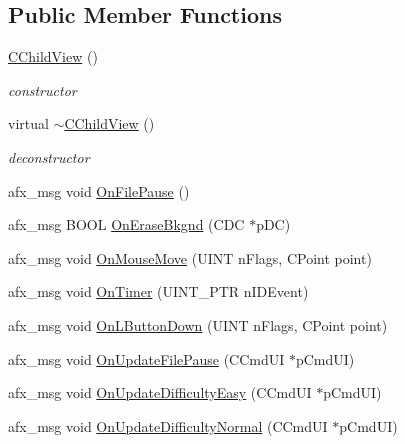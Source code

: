 \subsection*{Public Member Functions}
\begin{DoxyCompactItemize}
\item 
\mbox{\label{class_c_child_view_aff5af7c162c10755edbe58f260ded6d4}} 
\mbox{\hyperlink{class_c_child_view_aff5af7c162c10755edbe58f260ded6d4}{C\+Child\+View}} ()
\begin{DoxyCompactList}\small\item\em constructor \end{DoxyCompactList}\item 
\mbox{\label{class_c_child_view_a5b033b5e0a130950719a173b86418698}} 
virtual \mbox{\hyperlink{class_c_child_view_a5b033b5e0a130950719a173b86418698}{$\sim$\+C\+Child\+View}} ()
\begin{DoxyCompactList}\small\item\em deconstructor \end{DoxyCompactList}\item 
afx\+\_\+msg void \mbox{\hyperlink{class_c_child_view_aa6859229c37062c75e80ffc41aaeb2dd}{On\+File\+Pause}} ()
\item 
afx\+\_\+msg B\+O\+OL \mbox{\hyperlink{class_c_child_view_a6060e6d09d522d345dcee5a01d41c1f0}{On\+Erase\+Bkgnd}} (C\+DC $\ast$p\+DC)
\item 
afx\+\_\+msg void \mbox{\hyperlink{class_c_child_view_ad3cb2f8d9fa9a6fb06989513dee5a8bc}{On\+Mouse\+Move}} (U\+I\+NT n\+Flags, C\+Point point)
\item 
afx\+\_\+msg void \mbox{\hyperlink{class_c_child_view_a4c6bb8bd631cee84bb80c948f3d6d98a}{On\+Timer}} (U\+I\+N\+T\+\_\+\+P\+TR n\+I\+D\+Event)
\item 
afx\+\_\+msg void \mbox{\hyperlink{class_c_child_view_af513a57c45ce8b9dcc09dd934e228534}{On\+L\+Button\+Down}} (U\+I\+NT n\+Flags, C\+Point point)
\item 
afx\+\_\+msg void \mbox{\hyperlink{class_c_child_view_a8aa93825b42eb316b550b11d7643c058}{On\+Update\+File\+Pause}} (C\+Cmd\+UI $\ast$p\+Cmd\+UI)
\item 
afx\+\_\+msg void \mbox{\hyperlink{class_c_child_view_a881809e1f085e134ddb31a76cb7b72d4}{On\+Update\+Difficulty\+Easy}} (C\+Cmd\+UI $\ast$p\+Cmd\+UI)
\item 
afx\+\_\+msg void \mbox{\hyperlink{class_c_child_view_ac93835b94a1adc88c8e91d04e1ae0cb2}{On\+Update\+Difficulty\+Normal}} (C\+Cmd\+UI $\ast$p\+Cmd\+UI)

\end{DoxyCompactItemize}

